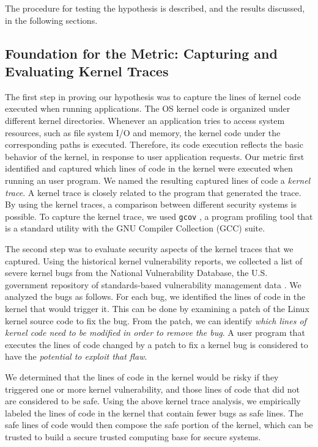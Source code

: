 The procedure for testing the hypothesis is described, and the results
discussed, in the following sections. 

\subsection{Foundation for the Metric: Capturing and Evaluating Kernel
Traces}

The first step in proving our hypothesis was to capture the lines of kernel
code executed 
when running applications. The OS kernel code is organized under different
kernel directories. 
Whenever an application tries to access system resources, such as file
system I/O and memory, 
the kernel code under the corresponding paths is executed. Therefore, 
its code execution reflects the basic behavior of the kernel, in response
to user application requests. 
Our metric first identified and captured which lines of code in the kernel
were executed 
when running an user program. We named the resulting captured lines of
code a \textit{kernel trace}. 
A kernel trace is closely related to the program that generated the trace. 
By using the kernel traces, a comparison between different
security systems is possible. 
To capture the kernel trace, we used \texttt{gcov} \cite{gcov}, a program profiling
tool that is a standard utility with the GNU Compiler Collection (GCC) suite. 

The second step was to evaluate security aspects of the kernel traces that
we captured. 
Using the historical kernel vulnerability reports, we collected a list of
severe kernel bugs from 
the National Vulnerability Database, the U.S. government repository of
standards-based 
vulnerability management data \cite{NVD}. We analyzed the bugs as
follows. For each bug, we identified the lines of code 
in the kernel that would trigger it. This can be done by examining 
a patch of the Linux kernel source code to fix the bug. From the patch, 
we can identify \textit{which lines of kernel code need to be modified in order to
remove the bug}. 
A user program that executes the lines of code changed by a patch to fix a
kernel bug is considered to have the \textit{potential to exploit that flaw}.

We determined that the lines of code in the kernel would be risky 
if they triggered one or more kernel vulnerability, and those lines of code 
that did not are considered to be safe. Using the above kernel trace
analysis, 
we empirically labeled the lines of code in the kernel that contain fewer
bugs as safe lines. 
The safe lines of code would then compose the safe portion of the kernel, 
which can be trusted to build a secure trusted computing base for secure
systems.

